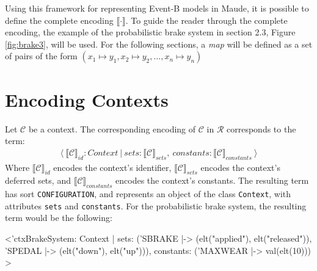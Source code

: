 Using this framework for representing Event-B models in Maude, it is possible to define the complete encoding $\llbracket \cdot \rrbracket$. To guide the reader through the complete encoding, the example of the probabilistic brake system in section 2.3, Figure \ref{fig:brake3}, will be used. For the following sections, a \textit{map} will be defined as a set of pairs of the form $(x_1 \mapsto y_1, x_2 \mapsto y_2, ... , x_n \mapsto y_n)$

\section{Encoding Contexts}
Let $\mathscr{C}$ be a context. The corresponding encoding of $\mathscr{C}$ in $\mathscr{R}$ corresponds to the term:
    \begin{align*}
    \langle \ \llbracket \mathscr{C} \rrbracket_{id} : Context \ | \ sets: \llbracket \mathscr{C} \rrbracket_{sets} , \ constants: \llbracket \mathscr{C} \rrbracket_{constants} \ \rangle
    \end{align*}   
Where $\llbracket \mathscr{C} \rrbracket_{id}$ encodes the context's identifier, $\llbracket \mathscr{C} \rrbracket_{sets}$ encodes the context's deferred sets, and $\llbracket \mathscr{C} \rrbracket_{constants}$ encodes the context's constants. The resulting term has sort \texttt{CONFIGURATION}, and represents an object of the class \texttt{Context}, with attributes \texttt{sets} and \texttt{constants}. For the probabilistic brake system, the resulting term would be the following:
\begin{maude}

<'ctxBrakeSystem: Context | 
                  sets: ('SBRAKE |-> (elt("applied"), elt("released")), 
                         'SPEDAL |-> (elt("down"), elt("up"))),
                  constants: ('MAXWEAR |-> val(elt(10))) >
\end{maude}
